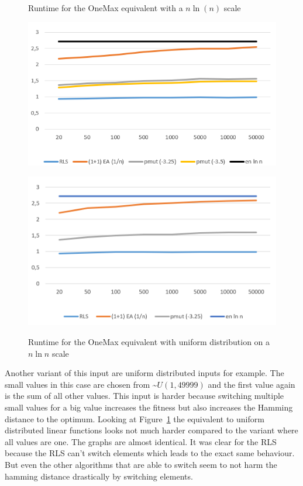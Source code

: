 \begin{figure}[h]
      \centering
      \begin{minipage}[b]{0.45\textwidth}
            \caption{Runtime for the OneMax equivalent with a $n\ln(n)$ scale}
            \includegraphics[width=\textwidth]{figures/images/oneMaxMultipleN.png}\label{fig:onemaxNlogNBound}
      \end{minipage}
      \hspace{0.75cm}
      \begin{minipage}[b]{0.45\textwidth}
            \caption{Runtime for the OneMax equivalent with uniform distribution on a $n\ln n$ scale}
            \includegraphics[width=\textwidth]{figures/images/oneMaxUniformMultipleN.png}\label{fig:onemaxUniformNlogNBound}
      \end{minipage}
\end{figure}

Another variant of this input are uniform distributed inputs for example.
The small values in this case are chosen from \textasciitilde$U(1,49999)$ and the first value again is the sum of all other values.
This input is harder because switching multiple small values for a big value increases the fitness but also increases the Hamming distance to the optimum. Looking at Figure~\ref{fig:onemaxUniformNlogNBound} the equivalent to uniform distributed linear functions looks not much harder compared to the variant where all values are one.
The graphs are almost identical.
It was clear for the RLS because the RLS can't switch elements which leads to the exact same behaviour.
But even the other algorithms that are able to switch seem to not harm the hamming distance drastically by switching elements.


